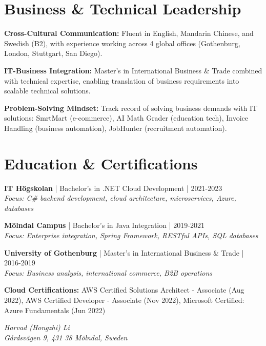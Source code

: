 \documentclass[10pt,a4paper]{article}
\begin{document}
\section*{Business \& Technical Leadership}

\textbf{Cross-Cultural Communication:} Fluent in English, Mandarin Chinese, and Swedish (B2), with experience working across 4 global offices (Gothenburg, London, Stuttgart, San Diego).

\textbf{IT-Business Integration:} Master's in International Business \& Trade combined with technical expertise, enabling translation of business requirements into scalable technical solutions.

\textbf{Problem-Solving Mindset:} Track record of solving business demands with IT solutions: SmrtMart (e-commerce), AI Math Grader (education tech), Invoice Handling (business automation), JobHunter (recruitment automation).

\section*{Education \& Certifications}

\textbf{IT Högskolan} | Bachelor's in .NET Cloud Development | 2021-2023\\
\textit{Focus: C\# backend development, cloud architecture, microservices, Azure, databases}

\textbf{Mölndal Campus} | Bachelor's in Java Integration | 2019-2021\\
\textit{Focus: Enterprise integration, Spring Framework, RESTful APIs, SQL databases}

\textbf{University of Gothenburg} | Master's in International Business \& Trade | 2016-2019\\
\textit{Focus: Business analysis, international commerce, B2B operations}

\textbf{Cloud Certifications:} AWS Certified Solutions Architect - Associate (Aug 2022), AWS Certified Developer - Associate (Nov 2022), Microsoft Certified: Azure Fundamentals (Jun 2022)

\vspace{20pt}
\begin{flushright}
\textit{Harvad (Hongzhi) Li}\\
\textit{Gårdsvägen 9, 431 38 Mölndal, Sweden}
\end{flushright}
\end{document}
